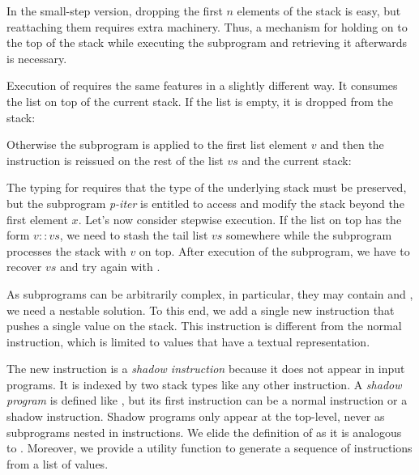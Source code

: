 In the small-step version, dropping the first $n$ elements of the
stack is easy, but reattaching them requires extra machinery.
Thus, a mechanism for holding on to the top of the stack while executing the subprogram
and retrieving it afterwards is necessary.

Execution of  requires the same features in a slightly different way.
It consumes the list on top of the current stack.
If the list is empty, it is dropped from the stack:
%
\BigstepIterNil

Otherwise the subprogram is applied to the first list element $v$ and then
the  instruction is reissued on the rest of the list $vs$
and the current stack:
\BigstepIterCons

The typing for  requires that the type of the underlying stack must
be preserved, but the subprogram \textit{p-iter} is
entitled to access and modify the stack beyond the first element $x$.
Let's now consider stepwise execution. If the list on top has the form $v
:: vs$,  we need to stash the tail list $vs$ somewhere while the subprogram
processes the stack with $v$ on top.
After execution of the subprogram,
we have to recover $vs$ and try again with .

As subprograms can be arbitrarily complex, in particular, they
may contain  and , we need a nestable solution.
To this end, we add a single new instruction  that pushes
a single value on the stack. This instruction is
different from the normal  instruction, which is limited to
 values that have a textual representation.
\ConcreteShadowInst

The new instruction is a \emph{shadow instruction} because it does not
appear in input programs. It is indexed by two stack types like
any other instruction.
A \emph{shadow program} is defined like , but its first
instruction can be a normal instruction or a shadow instruction. Shadow programs only appear
at the top-level, never as subprograms nested in instructions. We elide the definition of
 as it is analogous to . Moreover, we
provide a utility function  to generate a sequence of
 instructions from a list of values.
\ConcreteMpush


